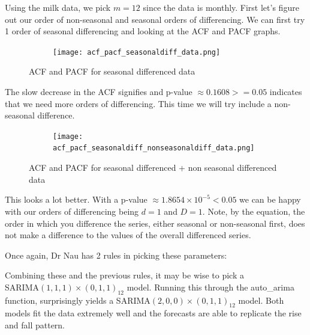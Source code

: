\documentclass{article}
\begin{document}
  Using the milk data, we pick $m = 12$ since the data is monthly.
  First let's figure out our order of non-seasonal and seasonal orders of differencing. We can first try 1 order of seasonal differencing and looking at the ACF and PACF graphs.
  \begin{figure}[H]
    \centering
    \captionsetup{justification=centering}
    \begin{subfigure}[b]{\linewidth}
      \texttt{[image: acf\_pacf\_seasonaldiff\_data.png]}
    \end{subfigure}
    \caption{ACF and PACF for seasonal differenced data}
  \end{figure}

  The slow decrease in the ACF signifies and p-value $\approx 0.1608 >=0.05$ indicates that we need more orders of differencing. This time we will try include a non-seasonal difference.
  \begin{figure}[H]
    \centering
    \captionsetup{justification=centering}
    \begin{subfigure}[b]{\linewidth}
      \texttt{[image: acf\_pacf\_seasonaldiff\_nonseasonaldiff\_data.png]}
    \end{subfigure}
    \caption{ACF and PACF for seasonal differenced + non seasonal differenced data}
  \end{figure}

  This looks a lot better. With a p-value $\approx 1.8654\times10^{-5}<0.05$ we can be happy with our orders of differencing being $d=1$ and $D=1$. Note, by the equation, the order in which you difference the series, either seasonal or non-seasonal first, does not make a difference to the values of the overall differenced series.
  
  Once again, Dr Nau has 2 rules in picking these parameters:
  \newline
  \emph{\\
  }

  Combining these and the previous rules, it may be wise to pick a\\
  SARIMA$(1,1,1)\times(0,1,1)_{12}$ model. Running this through the
  auto\_arima function, surprisingly yields a SARIMA$(2,0,0)\times(0,1,1)_{12}$ model. Both models fit the data extremely well and the forecasts are able to replicate the rise and fall pattern.
\end{document}
